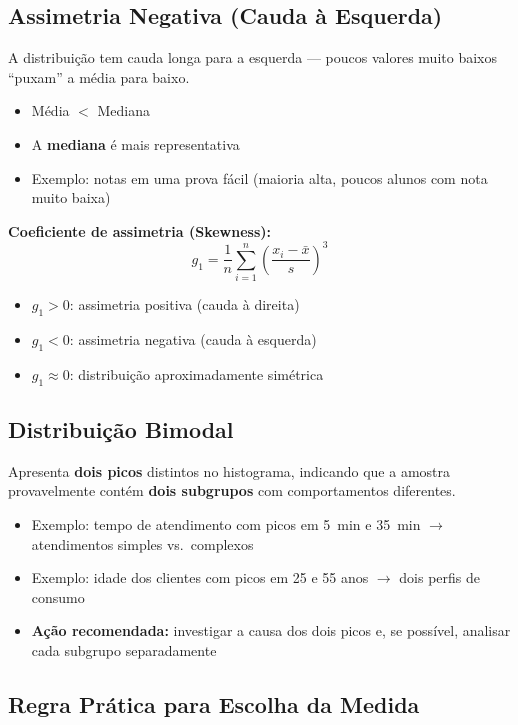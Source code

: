 \subsection*{Assimetria Negativa (Cauda à Esquerda)}

A distribuição tem cauda longa para a esquerda --- poucos valores muito baixos ``puxam'' a média para baixo.

\begin{itemize}[leftmargin=*]
  \item Média $<$ Mediana
  \item A \textbf{mediana} é mais representativa
  \item Exemplo: notas em uma prova fácil (maioria alta, poucos alunos com nota muito baixa)
\end{itemize}

\begin{FormulaBox}
\textbf{Coeficiente de assimetria (Skewness):}
\[
g_1 = \frac{1}{n}\sum_{i=1}^{n}\left(\frac{x_i - \bar{x}}{s}\right)^3
\]
\begin{itemize}
  \item $g_1 > 0$: assimetria positiva (cauda à direita)
  \item $g_1 < 0$: assimetria negativa (cauda à esquerda)
  \item $g_1 \approx 0$: distribuição aproximadamente simétrica
\end{itemize}
\end{FormulaBox}

\subsection*{Distribuição Bimodal}

Apresenta \textbf{dois picos} distintos no histograma, indicando que a amostra provavelmente contém \textbf{dois subgrupos} com comportamentos diferentes.

\begin{itemize}[leftmargin=*]
  \item Exemplo: tempo de atendimento com picos em 5~min e 35~min $\to$ atendimentos simples vs.\ complexos
  \item Exemplo: idade dos clientes com picos em 25 e 55 anos $\to$ dois perfis de consumo
  \item \textbf{Ação recomendada:} investigar a causa dos dois picos e, se possível, analisar cada subgrupo separadamente
\end{itemize}

\subsection*{Regra Prática para Escolha da Medida}

